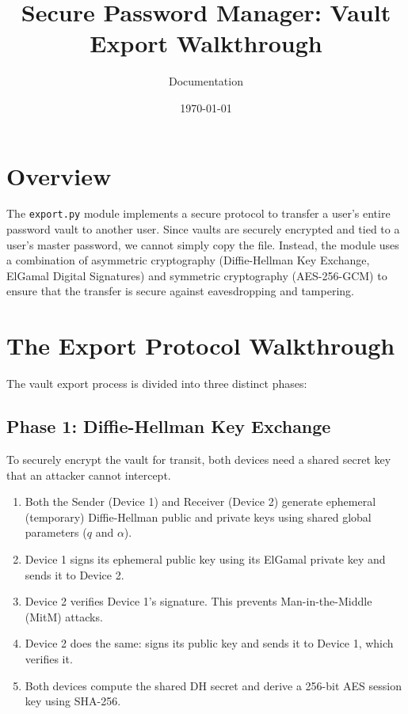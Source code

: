 \documentclass{article}
\title{Secure Password Manager: Vault Export Walkthrough}
\author{Documentation}
\date{\today}
\begin{document}
\maketitle

\section{Overview}
The \texttt{export.py} module implements a secure protocol to transfer a user's entire password vault to another user. Since vaults are securely encrypted and tied to a user's master password, we cannot simply copy the file. Instead, the module uses a combination of asymmetric cryptography (Diffie-Hellman Key Exchange, ElGamal Digital Signatures) and symmetric cryptography (AES-256-GCM) to ensure that the transfer is secure against eavesdropping and tampering.

\section{The Export Protocol Walkthrough}

The vault export process is divided into three distinct phases:

\subsection{Phase 1: Diffie-Hellman Key Exchange}
To securely encrypt the vault for transit, both devices need a shared secret key that an attacker cannot intercept.
\begin{enumerate}
    \item Both the Sender (Device 1) and Receiver (Device 2) generate ephemeral (temporary) Diffie-Hellman public and private keys using shared global parameters ($q$ and $\alpha$).
    \item Device 1 signs its ephemeral public key using its ElGamal private key and sends it to Device 2.
    \item Device 2 verifies Device 1's signature. This prevents Man-in-the-Middle (MitM) attacks.
    \item Device 2 does the same: signs its public key and sends it to Device 1, which verifies it.
    \item Both devices compute the shared DH secret and derive a 256-bit AES session key using SHA-256.
\end{enumerate}
\end{document}
